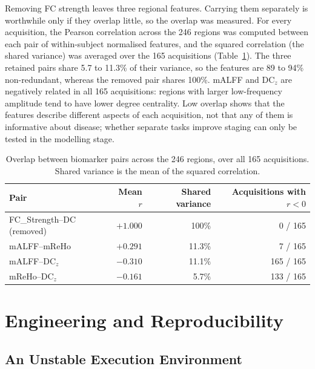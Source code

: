 \documentclass{ssnreview}
\begin{document}
Removing FC strength leaves three regional features. Carrying them separately is worthwhile only
if they overlap little, so the overlap was measured. For every acquisition, the Pearson
correlation across the 246 regions was computed between each pair of within-subject normalised
features, and the squared correlation (the shared variance) was averaged over the 165
acquisitions (Table~\ref{tab:complement}). The three retained pairs share 5.7 to 11.3\% of their
variance, so the features are 89 to 94\% non-redundant, whereas the removed pair shares 100\%.
mALFF and DC$_z$ are negatively related in all 165 acquisitions: regions with larger
low-frequency amplitude tend to have lower degree centrality. Low overlap shows that the features
describe different aspects of each acquisition, not that any of them is informative about disease;
whether separate tasks improve staging can only be tested in the modelling stage.

\begin{table}[!htbp]
\centering
\caption[Overlap between biomarker pairs]{Overlap between biomarker pairs across the 246 regions, over all 165
acquisitions. Shared variance is the mean of the squared correlation.}
\label{tab:complement}
\small
\begin{tabularx}{\textwidth}{@{}>{\raggedright\arraybackslash}Xrrr@{}}
\toprule
\textbf{Pair} & \textbf{Mean $r$} & \textbf{Shared variance} & \textbf{Acquisitions with $r<0$} \\
\midrule
FC\_Strength--DC (removed) & $+1.000$ & 100\% & 0 / 165 \\
mALFF--mReHo & $+0.291$ & 11.3\% & 7 / 165 \\
mALFF--DC$_z$ & $-0.310$ & 11.1\% & 165 / 165 \\
mReHo--DC$_z$ & $-0.161$ & 5.7\% & 133 / 165 \\
\bottomrule
\end{tabularx}
\end{table}

\section{Engineering and Reproducibility}

\subsection{An Unstable Execution Environment}
\end{document}
